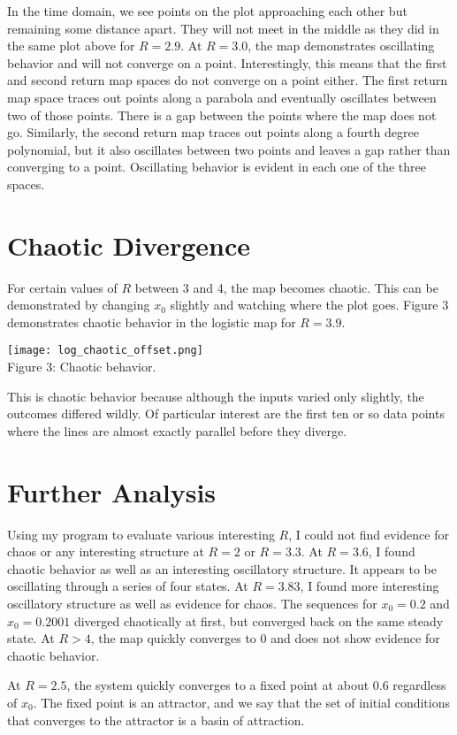 \documentclass[12pt, letterpaper]{article}
\begin{document}
In the time domain, we see points on the plot approaching each other but 
remaining some distance apart. They will not meet in the middle as they did in
the same plot above for $R = 2.9$. At $R = 3.0$, the map demonstrates
oscillating behavior and will not converge on a point. Interestingly, this means
that the first and second return map spaces do not converge on a point either. 
The first return map space traces out points along a parabola and eventually 
oscillates between two of those points. There is a gap between the points where
the map does not go. Similarly, the second return map traces out points along a
fourth degree polynomial, but it also oscillates between two points and leaves a
gap rather than converging to a point. Oscillating behavior is evident in each
one of the three spaces.

\section*{Chaotic Divergence}

For certain values of $R$ between 3 and 4, the map becomes chaotic. This can be
demonstrated by changing $x_0$ slightly and watching where the plot goes. 
Figure 3 demonstrates chaotic behavior in the logistic map for $R = 3.9$.

\begin{center}
\texttt{[image: log\_chaotic\_offset.png]}
\\
Figure 3: Chaotic behavior.
\\
\end{center}

This is chaotic behavior because although the inputs varied only slightly, the
outcomes differed wildly. Of particular interest are the first ten or so data
points where the lines are almost exactly parallel before they diverge.

\section*{Further Analysis}

Using my program to evaluate various interesting $R$, I could not find evidence 
for chaos or any interesting structure at $R = 2$ or $R = 3.3$. At $R = 3.6$, I 
found chaotic behavior as well as an interesting oscillatory structure. It 
appears to be oscillating through a series of four states. At $R = 3.83$, I 
found more interesting oscillatory structure as well as evidence for chaos. The
sequences for $x_0 = 0.2$ and $x_0 = 0.2001$ diverged chaotically at first, but
converged back on the same steady state. At $R > 4$, the map quickly converges
to 0 and does not show evidence for chaotic behavior.

At $R = 2.5$, the system quickly converges to a fixed point at about 0.6
regardless of $x_0$. The fixed point is an attractor, and we say that the set of
initial conditions that converges to the attractor is a basin of attraction.
\end{document}
